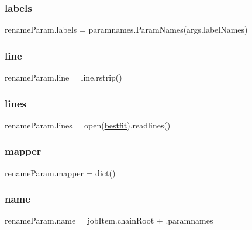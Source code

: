 \subsubsection{\texorpdfstring{labels}{labels}}
{\footnotesize\ttfamily rename\+Param.\+labels = paramnames.\+Param\+Names(args.\+label\+Names)}

\mbox{\label{namespacerenameParam_a1514d9e517c3a09886531e48e75d5bfe}} 
\subsubsection{\texorpdfstring{line}{line}}
{\footnotesize\ttfamily rename\+Param.\+line = line.\+rstrip()}

\mbox{\label{namespacerenameParam_af767304ff4d8866a704dc832fc4c48e4}} 
\subsubsection{\texorpdfstring{lines}{lines}}
{\footnotesize\ttfamily rename\+Param.\+lines = open(\mbox{\hyperlink{namespacerenameParam_a8f5657f015d113430e3313bdd6bde48f}{bestfit}}).readlines()}

\mbox{\label{namespacerenameParam_ac963cf6f6a5501113ebadbeb3d18ca28}} 
\subsubsection{\texorpdfstring{mapper}{mapper}}
{\footnotesize\ttfamily rename\+Param.\+mapper = dict()}

\mbox{\label{namespacerenameParam_acc5239392b836c3740beccfcf6245fc6}} 
\subsubsection{\texorpdfstring{name}{name}}
{\footnotesize\ttfamily rename\+Param.\+name = job\+Item.\+chain\+Root + \textquotesingle{}.paramnames\textquotesingle{}}

